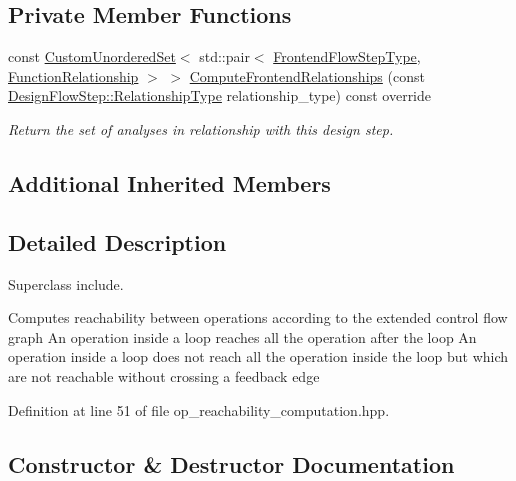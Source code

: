 \subsection*{Private Member Functions}
\begin{DoxyCompactItemize}
\item 
const \hyperlink{classCustomUnorderedSet}{Custom\+Unordered\+Set}$<$ std\+::pair$<$ \hyperlink{frontend__flow__step_8hpp_afeb3716c693d2b2e4ed3e6d04c3b63bb}{Frontend\+Flow\+Step\+Type}, \hyperlink{classFrontendFlowStep_af7cf30f2023e5b99e637dc2058289ab0}{Function\+Relationship} $>$ $>$ \hyperlink{classOpReachabilityComputation_a27d746a81ee9baa814405b99ef003131}{Compute\+Frontend\+Relationships} (const \hyperlink{classDesignFlowStep_a723a3baf19ff2ceb77bc13e099d0b1b7}{Design\+Flow\+Step\+::\+Relationship\+Type} relationship\+\_\+type) const override
\begin{DoxyCompactList}\small\item\em Return the set of analyses in relationship with this design step. \end{DoxyCompactList}\end{DoxyCompactItemize}
\subsection*{Additional Inherited Members}


\subsection{Detailed Description}
Superclass include. 

Computes reachability between operations according to the extended control flow graph An operation inside a loop reaches all the operation after the loop An operation inside a loop does not reach all the operation inside the loop but which are not reachable without crossing a feedback edge 

Definition at line 51 of file op\+\_\+reachability\+\_\+computation.\+hpp.



\subsection{Constructor \& Destructor Documentation}
\mbox{\label{classOpReachabilityComputation_aa13c82cc0275ae96b5c315158d272419}} 
